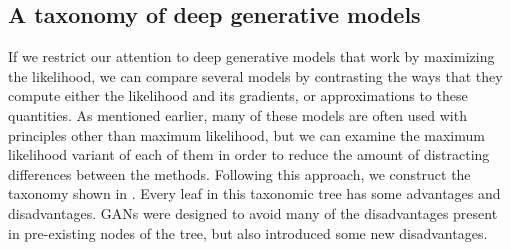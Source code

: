 \subsection{A taxonomy of deep generative models}

If we restrict our attention to deep generative models that work by maximizing
the likelihood, we can compare several models by contrasting the ways that they
compute either the likelihood and its gradients, or approximations to these
quantities.
As mentioned earlier, many of these models are often used with principles other
than maximum likelihood, but we can examine the maximum likelihood variant of
each of them in order to reduce the amount of distracting differences between
the methods.
Following this approach, we construct the taxonomy shown in .
Every leaf in this taxonomic tree has some advantages and disadvantages.
GANs were designed to avoid many of the disadvantages present in pre-existing
nodes of the tree, but also introduced some new disadvantages.


